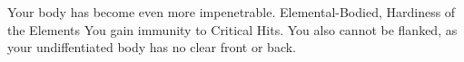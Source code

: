 \shortdescfeat
{Your body has become even more impenetrable.}
{Elemental-Bodied, Hardiness of the Elements}
{You gain immunity to Critical Hits.  You also cannot be flanked, as your undiffentiated body has no clear front or back.}



